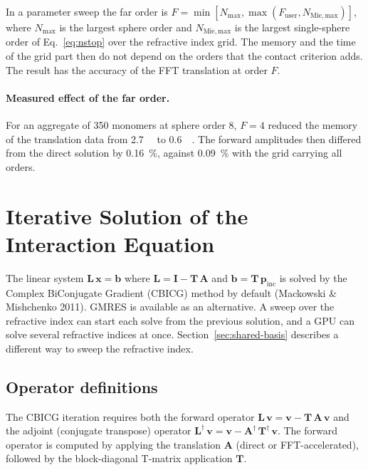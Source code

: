 \documentclass[11pt,a4paper]{article}
\begin{document}
In a parameter sweep the far order is $F = \min\!\left[N_\mathrm{max}, \max(F_\mathrm{user}, N_\mathrm{Mie,max})\right]$, where $N_\mathrm{max}$ is the largest sphere order and $N_\mathrm{Mie,max}$ is the largest single-sphere order of Eq.~\eqref{eq:nstop} over the refractive index grid.
The memory and the time of the grid part then do not depend on the orders that the contact criterion adds.
The result has the accuracy of the FFT translation at order $F$.
\paragraph{Measured effect of the far order.}
For an aggregate of 350 monomers at sphere order 8, $F = 4$ reduced the memory of the translation data from \SI{2.7}{\giga\byte} to \SI{0.6}{\giga\byte}.
The forward amplitudes then differed from the direct solution by \SI{0.16}{\percent}, against \SI{0.09}{\percent} with the grid carrying all orders.

\section{Iterative Solution of the Interaction Equation}
\label{sec:cbicg}

The linear system $\mathbf{L}\,\bm{x} = \bm{b}$ where $\mathbf{L} = \mathbf{I} - \mathbf{T}\,\mathbf{A}$ and $\bm{b} = \mathbf{T}\,\bm{p}_\mathrm{inc}$ is solved by the Complex BiConjugate Gradient (CBICG) method by default (Mackowski \& Mishchenko 2011).
GMRES is available as an alternative.
A sweep over the refractive index can start each solve from the previous solution, and a GPU can solve several refractive indices at once.
Section~\ref{sec:shared-basis} describes a different way to sweep the refractive index.

\subsection{Operator definitions}

The CBICG iteration requires both the forward operator $\mathbf{L}\,\bm{v} = \bm{v} - \mathbf{T}\,\mathbf{A}\,\bm{v}$ and the adjoint (conjugate transpose) operator $\mathbf{L}^\dagger\,\bm{v} = \bm{v} - \mathbf{A}^\dagger\,\mathbf{T}^\dagger\,\bm{v}$.
The forward operator is computed by applying the translation $\mathbf{A}$ (direct or FFT-accelerated), followed by the block-diagonal T-matrix application $\mathbf{T}$.
\end{document}
